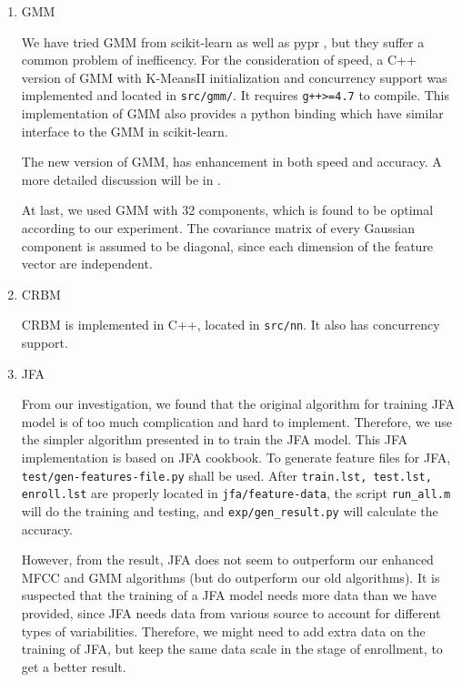 \begin{enumerate}
    \item GMM

      We have tried GMM from scikit-learn \cite{scikit-learn} as well as pypr \cite{pypr}, but
      they suffer a common problem of inefficency.
      For the consideration of speed, a C++ version of GMM with K-MeansII initialization and
      concurrency support
      was implemented and located in \verb|src/gmm/|. It requires \verb|g++>=4.7| to compile.
      This implementation of GMM also provides a python binding which have similar interface to the GMM in
      scikit-learn.

      The new version of GMM, has enhancement in both speed and accuracy. A more detailed discussion
      will be in .

      At last, we used GMM with 32 components, which is found to be optimal according to our experiment.
      The covariance matrix of every Gaussian component is assumed to be diagonal,
      since each dimension of the feature vector are independent.

    \item CRBM

      CRBM is implemented in C++, located in \verb|src/nn|. It also has concurrency support.

    \item JFA

      From our investigation, we found that the original algorithm \cite{jfa-se} for training JFA model is of
      too much complication and hard to implement.
      Therefore, we use the simpler algorithm presented in \cite{jfa-study}
      to train the JFA model.
      This JFA implementation is based on JFA cookbook\cite{cookbook}.
      To generate feature files for JFA, \verb|test/gen-features-file.py| shall be used.
      After \verb|train.lst, test.lst, enroll.lst| are properly located in \verb|jfa/feature-data|,
      the script \verb|run_all.m| will do the training and testing, and \verb|exp/gen_result.py|
      will calculate the accuracy.

      However, from the result, JFA does not seem to outperform our enhanced MFCC and GMM algorithms
      (but do outperform our old algorithms). It is suspected that the training of a JFA model needs more data than
      we have provided, since JFA needs data from various source to account for different types of variabilities.
      Therefore, we might need to add extra data on the training of JFA, but keep the same data scale in the stage of enrollment,
      to get a better result.


\end{enumerate}
